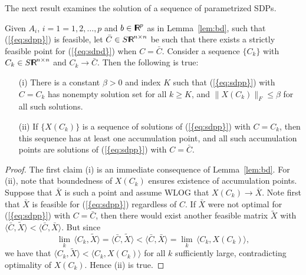 \documentclass{siamltex}
\begin{document}
The next result examines the solution of a sequence of parametrized
SDPs.
\begin{theorem} \label{th:limitsol} Given $A_i$, $i=1=1,2,\dotsc,p$
  and $b \in {\makebox{\sf I \hspace{-8.5 pt} R \hspace{-4.0pt}}}^p$ as in Lemma~\ref{lem:bd}, such that {(\ref{{eq:sdpp}})}
  is feasible, let $\bar{C} \in S{\makebox{\sf I \hspace{-8.5 pt} R \hspace{-4.0pt}}}^{n \times n}$ be such that there
  exists a strictly feasible point for {(\ref{{eq:sdpd}})} when
  $C=\bar{C}$. Consider a sequence $\{ C_k \}$ with $C_k \in S {\makebox{\sf I \hspace{-8.5 pt} R \hspace{-4.0pt}}}^{n
    \times n}$ and $C_k \to \bar{C}$. Then the following is true:
\begin{itemize}
\item[(i)] There is a constant $\beta >0$ and index $K$ such that
  {(\ref{{eq:sdpp}})} with $C=C_k$ has nonempty solution set for all $k
  \ge K$, and $\|X(C_k) \|_F \le \beta$ for all such solutions.
\item[(ii)] If $\{X(C_k)\}$ is a sequence of solutions of
  {(\ref{{eq:sdpp}})} with $C=C_k$, then this sequence has at least one
  accumulation point, and all such accumulation points are solutions
  of {(\ref{{eq:sdpp}})} with $C=\bar{C}$.
\end{itemize}
\end{theorem}
\begin{proof}
  The first claim (i) is an immediate consequence of
  Lemma~\ref{lem:bd}. For (ii), note that boundedness of $X(C_k)$
  ensures existence of accumulation points. Suppose that $\bar{X}$ is
  such a point and assume WLOG that $X(C_k) \to \bar{X}$. Note first
  that $\bar{X}$ is feasible for {(\ref{{eq:sdpp}})} regardless of $C$. If
  $\bar{X}$ were not optimal for {(\ref{{eq:sdpp}})} with $C=\bar{C}$,
  then there would exist another feasible matrix $\tilde{X}$ with
  $\langle \bar{C},\tilde{X} \rangle < \langle \bar{C},\bar{X}
  \rangle$. But since 
\[
\lim_k \, \langle C_k,\tilde{X} \rangle = \langle \bar{C},\tilde{X}
\rangle < \langle \bar{C},\bar{X} \rangle = \lim_k \, \langle C_k, X(C_k) \rangle,
\]
we have that $\langle C_k,\tilde{X} \rangle < \langle C_k,X(C_k) \rangle$
for all $k$ sufficiently large, contradicting optimality of
$X(C_k)$. Hence (ii) is true.
\end{proof}
\end{document}
